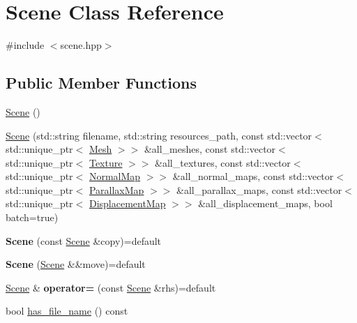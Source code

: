 \hypertarget{class_scene}{}\section{Scene Class Reference}
\label{class_scene}


{\ttfamily \#include $<$scene.\+hpp$>$}

\subsection*{Public Member Functions}
\begin{DoxyCompactItemize}
\item 
\mbox{\hyperlink{class_scene_ad10176d75a9cc0da56626f682d083507}{Scene}} ()
\item 
\mbox{\hyperlink{class_scene_a5311ceba0e507f805d3c5592155880fc}{Scene}} (std\+::string filename, std\+::string resources\+\_\+path, const std\+::vector$<$ std\+::unique\+\_\+ptr$<$ \mbox{\hyperlink{class_mesh}{Mesh}} $>$$>$ \&all\+\_\+meshes, const std\+::vector$<$ std\+::unique\+\_\+ptr$<$ \mbox{\hyperlink{class_texture}{Texture}} $>$$>$ \&all\+\_\+textures, const std\+::vector$<$ std\+::unique\+\_\+ptr$<$ \mbox{\hyperlink{class_normal_map}{Normal\+Map}} $>$$>$ \&all\+\_\+normal\+\_\+maps, const std\+::vector$<$ std\+::unique\+\_\+ptr$<$ \mbox{\hyperlink{class_parallax_map}{Parallax\+Map}} $>$$>$ \&all\+\_\+parallax\+\_\+maps, const std\+::vector$<$ std\+::unique\+\_\+ptr$<$ \mbox{\hyperlink{class_displacement_map}{Displacement\+Map}} $>$$>$ \&all\+\_\+displacement\+\_\+maps, bool batch=true)
\item 
\mbox{\label{class_scene_a04c85384325f658ca37be623fcffd941}} 
{\bfseries Scene} (const \mbox{\hyperlink{class_scene}{Scene}} \&copy)=default
\item 
\mbox{\label{class_scene_ac5227706d25b78969a6e37956fc49ebe}} 
{\bfseries Scene} (\mbox{\hyperlink{class_scene}{Scene}} \&\&move)=default
\item 
\mbox{\label{class_scene_accf9a458cf5352398186960f362930d0}} 
\mbox{\hyperlink{class_scene}{Scene}} \& {\bfseries operator=} (const \mbox{\hyperlink{class_scene}{Scene}} \&rhs)=default
\item 
bool \mbox{\hyperlink{class_scene_a743728388c669fc24f8bd3630f785fbe}{has\+\_\+file\+\_\+name}} () const
\item 
$$
\end{DoxyCompactItemize}
